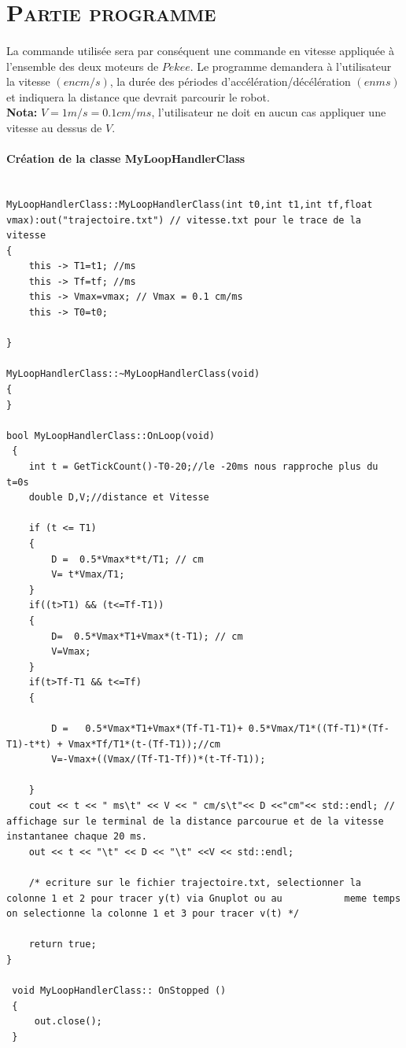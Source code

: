 \section{\textsc{Partie programme}} 

	\paragraph{} La commande utilisée sera par conséquent une commande en vitesse appliquée à l’ensemble des deux
moteurs de $Pekee$. Le programme demandera à l’utilisateur la vitesse $(en cm/s)$, la durée des périodes d’accélération/décélération $(en ms)$ et indiquera la distance que devrait parcourir le robot.\\
\textbf{Nota:} $V=1m/s = 0.1cm/ms$, l'utilisateur ne doit en aucun cas appliquer une vitesse au dessus de $V$.

\paragraph{Création de la classe MyLoopHandlerClass\\[0.25 cm]}

\begin{lstlisting}

MyLoopHandlerClass::MyLoopHandlerClass(int t0,int t1,int tf,float vmax):out("trajectoire.txt") // vitesse.txt pour le trace de la vitesse
{
	this -> T1=t1; //ms
	this -> Tf=tf; //ms
	this -> Vmax=vmax; // Vmax = 0.1 cm/ms
	this -> T0=t0;
	
}

MyLoopHandlerClass::~MyLoopHandlerClass(void)
{
}

bool MyLoopHandlerClass::OnLoop(void)
 {	
	int t = GetTickCount()-T0-20;//le -20ms nous rapproche plus du t=0s
	double D,V;//distance et Vitesse 
	
	if (t <= T1)
	{
		D =  0.5*Vmax*t*t/T1; // cm
		V= t*Vmax/T1;  
	}
	if((t>T1) && (t<=Tf-T1))
	{
		D=  0.5*Vmax*T1+Vmax*(t-T1); // cm
		V=Vmax;
	} 
	if(t>Tf-T1 && t<=Tf)
	{
	
		D =   0.5*Vmax*T1+Vmax*(Tf-T1-T1)+ 0.5*Vmax/T1*((Tf-T1)*(Tf-T1)-t*t) + Vmax*Tf/T1*(t-(Tf-T1));//cm 
		V=-Vmax+((Vmax/(Tf-T1-Tf))*(t-Tf-T1));
		
	}
	cout << t << " ms\t" << V << " cm/s\t"<< D <<"cm"<< std::endl; // affichage sur le terminal de la distance parcourue et de la vitesse instantanee chaque 20 ms.
	out << t << "\t" << D << "\t" <<V << std::endl;  
	
	/* ecriture sur le fichier trajectoire.txt, selectionner la colonne 1 et 2 pour tracer y(t) via Gnuplot ou au 			meme temps on selectionne la colonne 1 et 3 pour tracer v(t) */    

	return true;
}

 void MyLoopHandlerClass:: OnStopped ()
 {
	 out.close();
 }

\end{lstlisting}	

